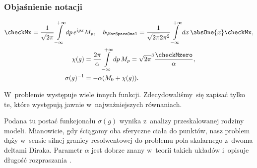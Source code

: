 \documentclass[10pt,t]{beamer}
\begin{document}
\begin{frame}
  \frametitle{Objaśnienie notacji}

  \vspace{-2em}



  \begin{subequations}

    \begin{align}
      \label{eq:Pole-skalarne-ETC-03-A}
      \checkMx =
        \frac{ 1 }{ \sqrt{ 2 \pi } }
      \int\limits_{ -\infty }^{ +\infty } dp \, e^{ i p x }
      &M_{ p }, \quad
        b_{ \HorSpaceOne 1 } =
        \frac{ 1 }{ \sqrt{ 2 \pi } 2 \pi^{ 2 } }
        \int\limits_{ -\infty }^{ +\infty } dx \, \absOne{ x } \checkMx, \\
      \label{eq:Pole-skalarne-ETC-03-B}
      \chi( g )
      &=
        \frac{ 2 \pi }{ \alpha }
        \int\limits_{ -\infty }^{ +\infty } dp \, M_{ p } =
        \sqrt{ 2 \pi }^{ 3 } \frac{ \checkMzero }{ \alpha }, \\
      \label{eq:Pole-skalarne-ETC-03-C}
      \sigma( g )^{ -1 }
      &=
        -\alpha ( M_{ 0 } + \chi( g ) ).
    \end{align}

  \end{subequations}

  \vspace{-1.8em}



  W~problemie występuje wiele innych funkcji. Zdecydowaliśmy~się zapisać
  tylko te, które występują jawnie w~najważniejszych równaniach.

  Podana tu postać funkcjonału $\sigma( g )$ wynika z~analizy przeskalowanej
  rodziny modeli. Mianowicie, gdy ściągamy oba sferyczne ciała do punktów,
  nasz problem dąży w~sensie silnej granicy resolwentowej do problemu
  pola skalarnego z~dwoma deltami Diraka. Parametr $\alpha$ jest dobrze znany
  w~teorii takich układów i~opisuje długość rozpraszania
  \parencite{Albeverio-et-al-Solvable-Models-in-Quantum-Mechanics-Pub-1988}.

\end{frame}
\end{document}
